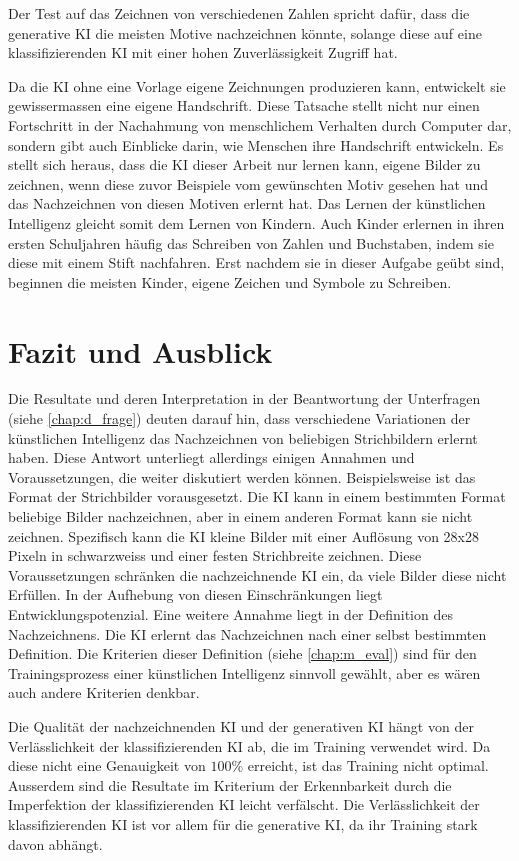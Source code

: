Der Test auf das Zeichnen von verschiedenen Zahlen spricht dafür, dass die
generative KI die meisten Motive nachzeichnen könnte, solange diese auf eine 
klassifizierenden KI mit einer hohen Zuverlässigkeit Zugriff hat.

Da die KI ohne eine Vorlage eigene Zeichnungen produzieren kann, entwickelt sie
gewissermassen eine eigene Handschrift. Diese Tatsache stellt nicht nur einen
Fortschritt in der Nachahmung von menschlichem Verhalten durch Computer dar,
sondern gibt auch Einblicke darin, wie Menschen ihre Handschrift entwickeln. Es
stellt sich heraus, dass die KI dieser Arbeit nur lernen kann, eigene Bilder zu
zeichnen, wenn diese zuvor Beispiele vom gewünschten Motiv gesehen hat und das
Nachzeichnen von diesen Motiven erlernt hat. Das Lernen der künstlichen
Intelligenz gleicht somit dem Lernen von Kindern. Auch Kinder erlernen in ihren
ersten Schuljahren häufig das Schreiben von Zahlen und Buchstaben, indem sie
diese mit einem Stift nachfahren. Erst nachdem sie in dieser Aufgabe geübt sind,
beginnen die meisten Kinder, eigene Zeichen und Symbole zu Schreiben.


\section{Fazit und Ausblick}\label{chap:d_faz-aus} Die Resultate und deren
Interpretation in der Beantwortung der Unterfragen (siehe \ref{chap:d_frage})
deuten darauf hin, dass verschiedene Variationen der künstlichen Intelligenz das
Nachzeichnen von beliebigen Strichbildern erlernt haben. Diese Antwort
unterliegt allerdings einigen Annahmen und Voraussetzungen, die weiter
diskutiert werden können. Beispielsweise ist das Format der Strichbilder
vorausgesetzt. Die KI kann in einem bestimmten Format beliebige Bilder
nachzeichnen, aber in einem anderen Format kann sie nicht zeichnen. Spezifisch
kann die KI kleine Bilder mit einer Auflösung von 28x28 Pixeln in schwarzweiss
und einer festen Strichbreite zeichnen. Diese Voraussetzungen schränken die
nachzeichnende KI ein, da viele Bilder diese nicht Erfüllen. In der Aufhebung
von diesen Einschränkungen liegt Entwicklungspotenzial. Eine weitere Annahme
liegt in der Definition des Nachzeichnens. Die KI erlernt das Nachzeichnen nach
einer selbst bestimmten Definition. Die Kriterien dieser Definition (siehe
\ref{chap:m_eval}) sind für den Trainingsprozess einer künstlichen Intelligenz
sinnvoll gewählt, aber es wären auch andere Kriterien denkbar.

Die Qualität der nachzeichnenden KI und der generativen KI hängt von der
Verlässlichkeit der klassifizierenden KI ab, die im Training verwendet wird. Da
diese nicht eine Genauigkeit von $100\%$ erreicht, ist das Training nicht
optimal. Ausserdem sind die Resultate im Kriterium der Erkennbarkeit durch die
Imperfektion der klassifizierenden KI leicht verfälscht. Die Verlässlichkeit der
klassifizierenden KI ist vor allem für die generative KI, da ihr Training stark
davon abhängt.

